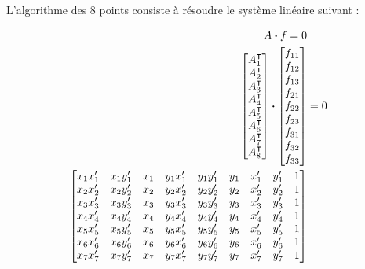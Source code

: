 \documentclass[12pt,a4paper,onecolumn]{article}
\begin{document}
L'algorithme des 8 points consiste à résoudre le système linéaire suivant :

\begin{equation*}
	\begin{split}
		A \dotproduct f = 0\\
		\begin{bmatrix}
			A_1^{\intercal} \\
			A_2^{\intercal} \\
			A_3^{\intercal} \\
			A_4^{\intercal} \\
			A_5^{\intercal} \\
			A_6^{\intercal} \\
			A_7^{\intercal} \\
			A_8^{\intercal} \\
		\end{bmatrix}
		\dotproduct
		\begin{bmatrix}
			f_{11} \\
			f_{12} \\
			f_{13} \\
			f_{21} \\
			f_{22} \\
			f_{23} \\
			f_{31} \\
			f_{32} \\
			f_{33}
		\end{bmatrix}
		&=
		0\\
		\begin{bmatrix}
			x_1x_1^{\prime} & x_1y_1^{\prime} & x_1 & y_1x_1^{\prime} & y_1y_1^{\prime} & y_1 & x_1^{\prime} & y_1^{\prime} & 1 \\
			x_2x_2^{\prime} & x_2y_2^{\prime} & x_2 & y_2x_2^{\prime} & y_2y_2^{\prime} & y_2 & x_2^{\prime} & y_2^{\prime} & 1 \\
			x_3x_3^{\prime} & x_3y_3^{\prime} & x_3 & y_3x_3^{\prime} & y_3y_3^{\prime} & y_3 & x_3^{\prime} & y_3^{\prime} & 1 \\
			x_4x_4^{\prime} & x_4y_4^{\prime} & x_4 & y_4x_4^{\prime} & y_4y_4^{\prime} & y_4 & x_4^{\prime} & y_4^{\prime} & 1 \\
			x_5x_5^{\prime} & x_5y_5^{\prime} & x_5 & y_5x_5^{\prime} & y_5y_5^{\prime} & y_5 & x_5^{\prime} & y_5^{\prime} & 1 \\
			x_6x_6^{\prime} & x_6y_6^{\prime} & x_6 & y_6x_6^{\prime} & y_6y_6^{\prime} & y_6 & x_6^{\prime} & y_6^{\prime} & 1 \\
			x_7x_7^{\prime} & x_7y_7^{\prime} & x_7 & y_7x_7^{\prime} & y_7y_7^{\prime} & y_7 & x_7^{\prime} & y_7^{\prime} & 1 \\

\end{bmatrix}
\end{split}
\end{equation*}
\end{document}
